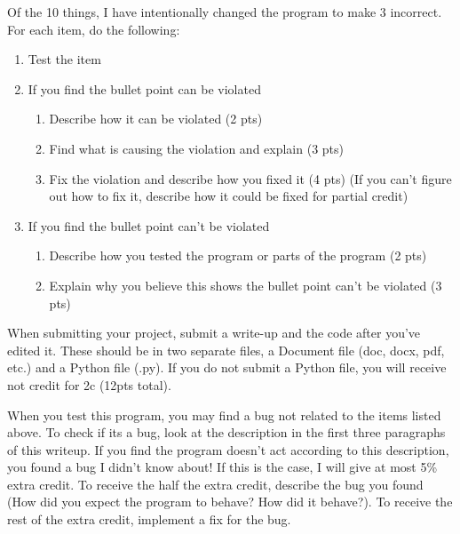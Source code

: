 \documentclass{article}
\begin{document}
Of the 10 things, I have intentionally changed the program to make 3 incorrect. For each item, do the following:
\begin{enumerate}
    \item Test the item
    \item If you find the bullet point can be violated
    \begin{enumerate}
        \item Describe how it can be violated (2 pts)
        \item Find what is causing the violation and explain (3 pts)
        \item Fix the violation and describe how you fixed it (4 pts) (If you can't figure out how to fix it, describe how it could be fixed for partial credit)
    \end{enumerate}
    \item If you find the bullet point can't be violated
    \begin{enumerate}
        \item Describe how you tested the program or parts of the program (2 pts)
        \item Explain why you believe this shows the bullet point can't be violated (3 pts)
    \end{enumerate}
\end{enumerate}

When submitting your project, submit a write-up and the code after you've edited it. These should be in two separate files,
a Document file (doc, docx, pdf, etc.) and a Python file (.py). If you do not submit a Python file, you will receive not
credit for 2c (12pts total).

When you test this program, you may find a bug not related to the items listed above. To check if its a bug,
look at the description in the first three paragraphs of this writeup. If you find the program doesn't act
according to this description, you found a bug I didn't know about! If this is the case, I will give at most 5\% extra credit.
To receive the half the extra credit, describe the bug you found (How did you expect the program to behave? How did it behave?).
To receive the rest of the extra credit, implement a fix for the bug.
\end{document}
